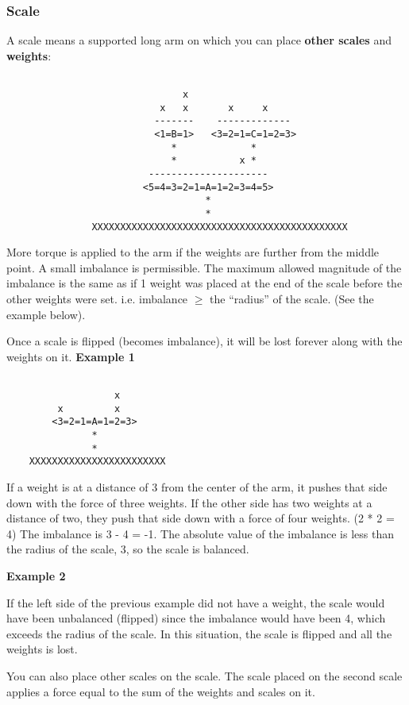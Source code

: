 \documentclass[12pt]{article}
\begin{document}
\subsubsection{Scale}
A scale means a supported long arm on which you can place \textbf{other scales}
and \textbf{weights}:
\begin{verbatim}

                               x
                           x   x       x     x
                          -------    -------------
                          <1=B=1>   <3=2=1=C=1=2=3>
                             *             *
                             *           x *
                         ---------------------
                        <5=4=3=2=1=A=1=2=3=4=5>
                                   *
                                   *
               XXXXXXXXXXXXXXXXXXXXXXXXXXXXXXXXXXXXXXXXXXXXX
\end{verbatim}

More torque is applied to the arm if the weights are further from the middle
point. A small imbalance is permissible. The maximum allowed magnitude of the
imbalance is the same as if 1 weight was placed at the end of the scale before
the other weights were set. i.e. imbalance $\geq$ the ``radius” of the scale.
(See the example below).

Once a scale is flipped (becomes imbalance), it will be lost forever along with
the weights on it.
\newpage
\textbf{Example 1}
\begin{verbatim}

                   x
         x         x
        <3=2=1=A=1=2=3>
               *
               *
    XXXXXXXXXXXXXXXXXXXXXXXX
\end{verbatim}

If a weight is at a distance of 3 from the center of the arm, it pushes that
side down with the force of three weights. If the other side has two weights at
a distance of two, they push that side down with a force of four weights. (2 * 2
= 4) The imbalance is 3 - 4 = -1. The absolute value of the imbalance is less
than the radius of the scale, 3, so the scale is balanced.

\textbf{Example 2}

If the left side of the previous example did not have a weight, the scale would
have been unbalanced (flipped) since the imbalance would have been 4, which
exceeds the radius of the scale. In this situation, the scale is flipped and all
the weights is lost.  

You can also place other scales on the scale. The scale placed on the second
scale applies a force equal to the sum of the weights and scales on it.
\end{document}
